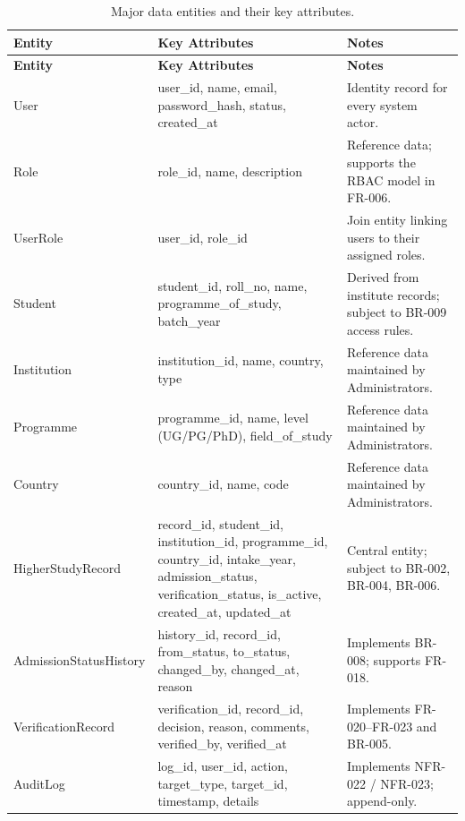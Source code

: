 \documentclass[11pt,a4paper]{article}
\begin{document}
\begin{longtable}{@{}p{3.6cm} p{4.0cm} p{8.0cm}@{}}
\caption{Major data entities and their key attributes.}
\label{tab:data}
\toprule
\textbf{Entity} & \textbf{Key Attributes} & \textbf{Notes} \\
\midrule
\endfirsthead
\toprule
\textbf{Entity} & \textbf{Key Attributes} & \textbf{Notes} \\
\midrule
\endhead
User & user\_id, name, email, password\_hash, status, created\_at & Identity record for every system actor. \\
Role & role\_id, name, description & Reference data; supports the RBAC model in FR-006. \\
UserRole & user\_id, role\_id & Join entity linking users to their assigned roles. \\
Student & student\_id, roll\_no, name, programme\_of\_study, batch\_year & Derived from institute records; subject to BR-009 access rules. \\
Institution & institution\_id, name, country, type & Reference data maintained by Administrators. \\
Programme & programme\_id, name, level (UG/PG/PhD), field\_of\_study & Reference data maintained by Administrators. \\
Country & country\_id, name, code & Reference data maintained by Administrators. \\
HigherStudyRecord & record\_id, student\_id, institution\_id, programme\_id, country\_id, intake\_year, admission\_status, verification\_status, is\_active, created\_at, updated\_at & Central entity; subject to BR-002, BR-004, BR-006. \\
AdmissionStatusHistory & history\_id, record\_id, from\_status, to\_status, changed\_by, changed\_at, reason & Implements BR-008; supports FR-018. \\
VerificationRecord & verification\_id, record\_id, decision, reason, comments, verified\_by, verified\_at & Implements FR-020--FR-023 and BR-005. \\
AuditLog & log\_id, user\_id, action, target\_type, target\_id, timestamp, details & Implements NFR-022 / NFR-023; append-only. \\
\bottomrule
\end{longtable}

\end{document}

